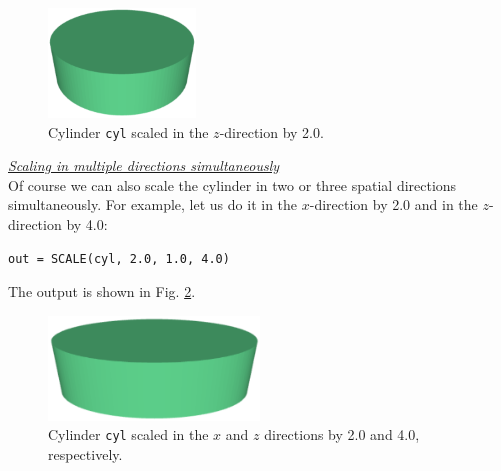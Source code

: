 \begin{figure}[!ht]
\begin{center}
\includegraphics[width=0.35\textwidth]{img/scale-3.png}
\end{center}
\vspace{-4mm}
\caption{Cylinder {\tt cyl} scaled in the $z$-direction by 2.0.}
\label{fig:scale-3}
\end{figure}

\noindent
\underline{\em Scaling in multiple directions simultaneously}\\

Of course we can also scale the cylinder in two or three spatial directions 
simultaneously. For example, let us do it in the $x$-direction 
by 2.0 and in the $z$-direction by 4.0:\\

\begin{bbox}
\begin{verbatim}
out = SCALE(cyl, 2.0, 1.0, 4.0)
\end{verbatim}
\end{bbox}
\vspace{6mm}

\noindent
The output is shown in Fig. \ref{fig:scale-4}.


\begin{figure}[!ht]
\begin{center}
\includegraphics[width=0.5\textwidth]{img/scale-4.png}
\end{center}
\vspace{-4mm}
\caption{Cylinder {\tt cyl} scaled in the $x$ and $z$ directions by 2.0 and 4.0, respectively.}
\label{fig:scale-4}
\vspace{-1cm}
\end{figure}

